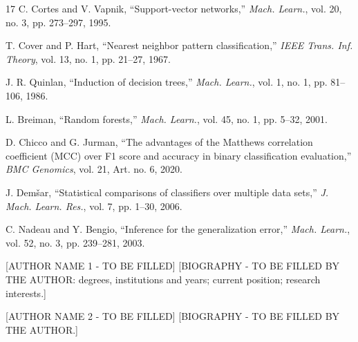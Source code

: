 \documentclass{ieeeaccess}
\begin{document}
\begin{thebibliography}{17}
 C. Cortes and V. Vapnik, ``Support-vector networks,'' \textit{Mach. Learn.}, vol. 20, no. 3, pp. 273--297, 1995.

 T. Cover and P. Hart, ``Nearest neighbor pattern classification,'' \textit{IEEE Trans. Inf. Theory}, vol. 13, no. 1, pp. 21--27, 1967.

 J. R. Quinlan, ``Induction of decision trees,'' \textit{Mach. Learn.}, vol. 1, no. 1, pp. 81--106, 1986.

 L. Breiman, ``Random forests,'' \textit{Mach. Learn.}, vol. 45, no. 1, pp. 5--32, 2001.

 D. Chicco and G. Jurman, ``The advantages of the Matthews correlation coefficient (MCC) over F1 score and accuracy in binary classification evaluation,'' \textit{BMC Genomics}, vol. 21, Art. no. 6, 2020.

 J. Dem\v{s}ar, ``Statistical comparisons of classifiers over multiple data sets,'' \textit{J. Mach. Learn. Res.}, vol. 7, pp. 1--30, 2006.

 C. Nadeau and Y. Bengio, ``Inference for the generalization error,'' \textit{Mach. Learn.}, vol. 52, no. 3, pp. 239--281, 2003.
\end{thebibliography}

\begin{IEEEbiographynophoto}{[AUTHOR NAME 1 - TO BE FILLED]}
[BIOGRAPHY - TO BE FILLED BY THE AUTHOR: degrees, institutions and years; current position; research interests.]
\end{IEEEbiographynophoto}

\begin{IEEEbiographynophoto}{[AUTHOR NAME 2 - TO BE FILLED]}
[BIOGRAPHY - TO BE FILLED BY THE AUTHOR.]
\end{IEEEbiographynophoto}

\EOD
\end{document}

